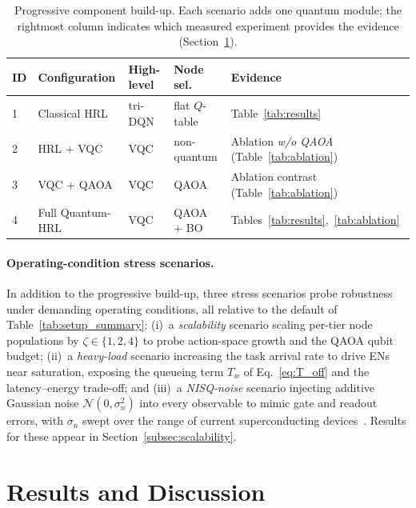 \documentclass[11pt,a4paper]{article}
\theoremstyle{definition}
\begin{document}
\begin{table}[t]
\centering
\small
\caption{Progressive component build-up. Each scenario adds one quantum module; the rightmost column indicates which measured experiment provides the evidence (Section~\ref{sec:results}).}
\label{tab:progressive}
\begin{tabular}{@{}p{1.0cm}p{3.4cm}p{3.0cm}p{2.3cm}p{3.6cm}@{}}
\toprule
\textbf{ID} & \textbf{Configuration} & \textbf{High-level} & \textbf{Node sel.} & \textbf{Evidence} \\
\midrule
1 & Classical HRL~\cite{hrl_ntn} & tri-DQN & flat $Q$-table & Table~\ref{tab:results} \\
2 & HRL + VQC & VQC & non-quantum & Ablation \emph{w/o QAOA} (Table~\ref{tab:ablation}) \\
3 & VQC + QAOA & VQC & QAOA & Ablation contrast (Table~\ref{tab:ablation}) \\
4 & Full Quantum-HRL & VQC & QAOA $+$ BO & Tables~\ref{tab:results},~\ref{tab:ablation} \\
\bottomrule
\end{tabular}
\end{table}

\paragraph{Operating-condition stress scenarios.}
In addition to the progressive build-up, three stress scenarios probe robustness under demanding operating conditions, all relative to the default of Table~\ref{tab:setup_summary}: (i)~a \emph{scalability} scenario scaling per-tier node populations by $\zeta\in\{1,2,4\}$ to probe action-space growth and the QAOA qubit budget; (ii)~a \emph{heavy-load} scenario increasing the task arrival rate to drive ENs near saturation, exposing the queueing term $T_w$ of Eq.~\eqref{eq:T_off} and the latency--energy trade-off; and (iii)~a \emph{NISQ-noise} scenario injecting additive Gaussian noise $\mathcal{N}(0,\sigma_n^2)$ into every observable to mimic gate and readout errors, with $\sigma_n$ swept over the range of current superconducting devices~\cite{preskill2018nisq}. Results for these appear in Section~\ref{subsec:scalability}.

\section{Results and Discussion}
\label{sec:results}
\end{document}
